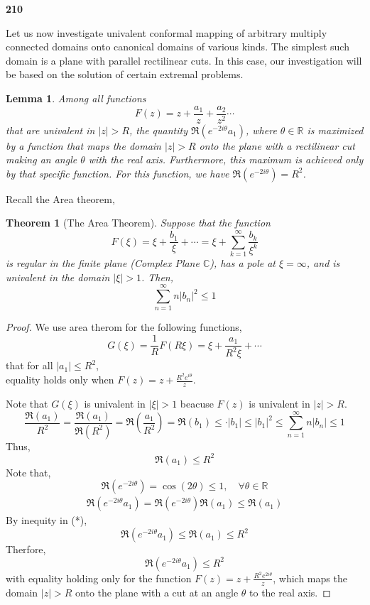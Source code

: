 \documentclass[
]{book}
\newtheorem{theorem}{Theorem}[chapter]
\newtheorem{lemma}{Lemma}[chapter]
\theoremstyle{definition}
\theoremstyle{definition}
\theoremstyle{definition}
\theoremstyle{definition}
\theoremstyle{remark}
\begin{document}
\textbf{210}

Let us now investigate univalent conformal mapping of arbitrary multiply connected domains onto canonical domains of various kinds. The simplest such domain is a plane with parallel rectilinear cuts. In this case, our investigation will be based on the solution of certain extremal problems.

\begin{lemma}
\protect\hypertarget{lem:unnamed-chunk-13}{}\label{lem:unnamed-chunk-13}Among all functions
\[F(z) = z + \frac{a_1}{z}+\frac{a_2}{z^2} \cdots\]
that are univalent in \(|z| > R\), the quantity \(\Re(e^{-2i\theta}a_1)\), where \(\theta\in \mathbb{R}\) is maximized by a function that maps the domain \(|z| > R\) onto the plane with a rectilinear cut making an angle \(\theta\) with the real axis. Furthermore, this maximum is achieved only by that specific function. For this function, we have \(\Re(e^{-2i\theta}) = R^2\).
\end{lemma}

Recall the Area theorem,

\begin{theorem}[The Area Theorem]
\protect\hypertarget{thm:unnamed-chunk-14}{}\label{thm:unnamed-chunk-14}Suppose that the function
\[F(\xi) = \xi+\frac{b_1}{\xi}+\cdots=\xi + \sum_{k=1}^{\infty} \frac{b_k}{ \xi^k}\]
is regular in the finite plane (Complex Plane \(\mathbb{C}\)), has a pole at \(\xi = \infty\), and is univalent in the domain \(|\xi| > 1\). Then,
\[ \sum_{n=1}^{\infty}n|b_n|^2\leq 1\]
\end{theorem}

\begin{proof}
We use area therom for the following functions,
\[G(\xi)=\frac{1}{R}F(R\xi)=\xi+\frac{a_1}{R^2\xi}+\cdots\]
that for all \(|a_1|\leq R^2\),\\
equality holds only when \(F(z) = z + \frac{R^2 e^{i\theta}}{z}\).

Note that \(G(\xi)\) is univalent in \(|\xi|>1\) beacuse \(F(z)\) is univalent in \(|z|>R\).
\[\frac{\Re(a_1)}{R^2}=\frac{\Re(a_1)}{\Re(R^2)}=\Re\left(\frac{a_1}{R^2}\right)=\Re(b_1)\leq \cdot |b_1|\leq |b_1|^2 \leq \sum_{n=1}^\infty n|b_n|\leq 1\]
Thus,
\[{\Re(a_1)}\leq {R^2}\]
Note that,
\[\Re(e^{-2i\theta})=\cos(2\theta)\leq 1,\quad \forall \theta \in \mathbb{R}\]
\begin{eqnarray*}
\Re(e^{-2i\theta}a_1)=\Re(e^{-2i\theta})\Re(a_1)\leq \Re(a_1)
\end{eqnarray*}
By inequity in (*),
\[ \Re(e^{-2i\theta} a_1) \leq \Re(a_1)\leq R^2 \]
Therfore,
\[\Re(e^{-2i\theta} a_1) \leq R^2\]
with equality holding only for the function \(F(z) = z + \frac{R^2 e^{2i\theta}}{ z}\), which maps the domain \(|z| > R\) onto the plane with a cut at an angle \(\theta\) to the real axis.
\end{proof}
\end{document}
